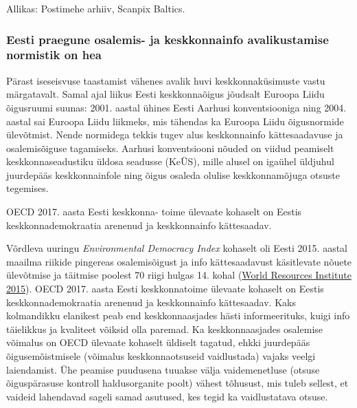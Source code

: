 \documentclass[estonian,]{article}
\begin{document}
\begin{imgsource}
{Allikas:} Postimehe arhiiv, Scanpix Baltics.
\end{imgsource}

\hypertarget{eesti-praegune-osalemis--ja-keskkonnainfo-avalikustamise-normistik-on-hea}{%
\subsubsection*{Eesti praegune osalemis- ja keskkonnainfo avalikustamise normistik on hea}\label{eesti-praegune-osalemis--ja-keskkonnainfo-avalikustamise-normistik-on-hea}}

Pärast iseseisvuse taastamist vähenes avalik huvi keskkonnaküsimuste vastu märgatavalt. Samal ajal liikus Eesti keskkonnaõigus jõudsalt Euroopa Liidu õigusruumi suunas: 2001. aastal ühines Eesti Aarhusi konventsiooniga ning 2004. aastal sai Euroopa Liidu liikmeks, mis tähendas ka Euroopa Liidu õigusnormide ülevõtmist. Nende normidega tekkis tugev alus keskkonnainfo kättesaadavuse ja osalemisõiguse tagamiseks. Aarhusi konventsiooni nõuded on viidud peamiselt keskkonnaseadustiku üldosa seadusse (KeÜS), mille alusel on igaühel üldjuhul juurdepääs keskkonnainfole ning õigus osaleda olulise keskkonnamõjuga otsuste tegemises.

\begin{blockquote-left}
OECD 2017. aasta Eesti keskkonna- toime ülevaate kohaselt on Eestis
keskkonnademokraatia arenenud ja keskkonnainfo kättesaadav.
\end{blockquote-left}

Võrdleva uuringu \emph{Environmental Democracy Index} kohaselt oli Eesti 2015. aastal maailma riikide pingereas osalemisõigust ja info kättesaadavust käsitlevate nõuete ülevõtmise ja täitmise poolest 70 riigi hulgas 14. kohal (\protect\hyperlink{World2015}{World Resources Institute 2015}). OECD 2017. aasta Eesti keskkonnatoime ülevaate kohaselt on Eestis keskkonnademokraatia arenenud ja keskkonnainfo kättesaadav. Kaks kolmandikku elanikest peab end keskkonnaasjades hästi informeerituks, kuigi info täielikkus ja kvaliteet võiksid olla paremad. Ka keskkonnaasjades osalemise võimalus on OECD ülevaate kohaselt üldiselt tagatud, ehkki juurdepääs õigusemõistmisele (võimalus keskkonnaotsuseid vaidlustada) vajaks veelgi laiendamist. Ühe peamise puudusena tuuakse välja vaidemenetluse (otsuse õiguspärasuse kontroll haldusorganite poolt) vähest tõhusust, mis tuleb sellest, et vaideid lahendavad sageli samad asutused, kes tegid ka vaidlustatava otsuse.
\end{document}
